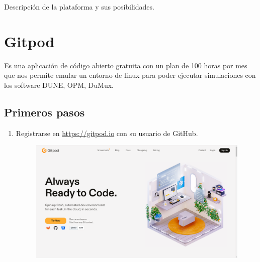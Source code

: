 Descripción de la plataforma y sus posibilidades.
\section{Gitpod}

Es una aplicación de código abierto gratuita con un plan de 100 horas por mes que nos permite emular un entorno de linux para poder ejecutar simulaciones con los software DUNE, OPM, DuMux.

\subsection{Primeros pasos}

\begin{enumerate}
	\item Registrarse en \url{https://gitpod.io} con su usuario de GitHub.
	      \begin{figure}[ht!]
		      \centering
		      \includegraphics[width=.6\paperwidth]{images/homepage}
	      \end{figure}


\end{enumerate}
